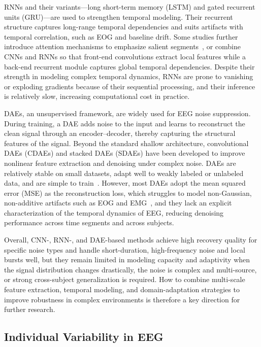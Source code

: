 RNNs and their variants---long short-term memory (LSTM) and gated recurrent
units (GRU)---are used to strengthen temporal modeling. Their recurrent
structure captures long-range temporal dependencies and suits artifacts with
temporal correlation, such as EOG and baseline drift. Some studies further
introduce attention mechanisms to emphasize salient
segments~\cite{chen2022openworld}, or combine CNNs and RNNs so that
front-end convolutions extract local features while a back-end recurrent module
captures global temporal dependencies. Despite their strength in modeling
complex temporal dynamics, RNNs are prone to vanishing or exploding gradients
because of their sequential processing, and their inference is relatively slow,
increasing computational cost in practice.

DAEs, an unsupervised framework, are widely used for EEG noise suppression.
During training, a DAE adds noise to the input and learns to reconstruct the
clean signal through an encoder--decoder, thereby capturing the structural
features of the signal. Beyond the standard shallow architecture, convolutional
DAEs (CDAEs) and stacked DAEs (SDAEs) have been developed to improve nonlinear
feature extraction and denoising under complex noise. DAEs are relatively stable
on small datasets, adapt well to weakly labeled or unlabeled data, and are
simple to train~\cite{chiang2019fcn}. However, most DAEs adopt the mean squared
error (MSE) as the reconstruction loss, which struggles to model non-Gaussian,
non-additive artifacts such as EOG and EMG~\cite{ghosh2019eyeblink}, and they
lack an explicit characterization of the temporal dynamics of EEG, reducing
denoising performance across time segments and across subjects.

Overall, CNN-, RNN-, and DAE-based methods achieve high recovery quality for
specific noise types and handle short-duration, high-frequency noise and local
bursts well, but they remain limited in modeling capacity and adaptivity when
the signal distribution changes drastically, the noise is complex and
multi-source, or strong cross-subject generalization is required. How to combine
multi-scale feature extraction, temporal modeling, and domain-adaptation
strategies to improve robustness in complex environments is therefore a key
direction for further research.

\subsection{Individual Variability in EEG}
\label{sec:related_subject}

